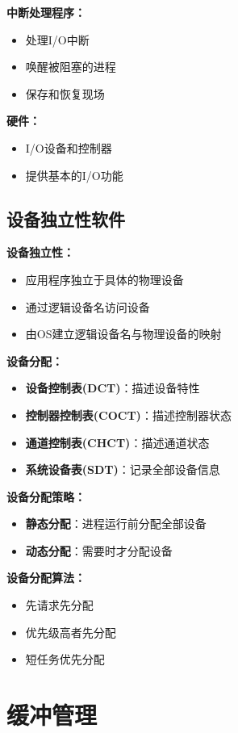 \documentclass[lang=cn,newtx,10pt,scheme=chinese]{../../elegantbook}
\begin{document}
\textbf{中断处理程序：}
\begin{itemize}
  \item 处理I/O中断
  \item 唤醒被阻塞的进程
  \item 保存和恢复现场
\end{itemize}

\textbf{硬件：}
\begin{itemize}
  \item I/O设备和控制器
  \item 提供基本的I/O功能
\end{itemize}

\subsection{设备独立性软件}

\textbf{设备独立性：}
\begin{itemize}
  \item 应用程序独立于具体的物理设备
  \item 通过逻辑设备名访问设备
  \item 由OS建立逻辑设备名与物理设备的映射
\end{itemize}

\textbf{设备分配：}
\begin{itemize}
  \item \textbf{设备控制表(DCT)}：描述设备特性
  \item \textbf{控制器控制表(COCT)}：描述控制器状态
  \item \textbf{通道控制表(CHCT)}：描述通道状态
  \item \textbf{系统设备表(SDT)}：记录全部设备信息
\end{itemize}

\textbf{设备分配策略：}
\begin{itemize}
  \item \textbf{静态分配}：进程运行前分配全部设备
  \item \textbf{动态分配}：需要时才分配设备
\end{itemize}

\textbf{设备分配算法：}
\begin{itemize}
  \item 先请求先分配
  \item 优先级高者先分配
  \item 短任务优先分配
\end{itemize}

\section{缓冲管理}
\end{document}
